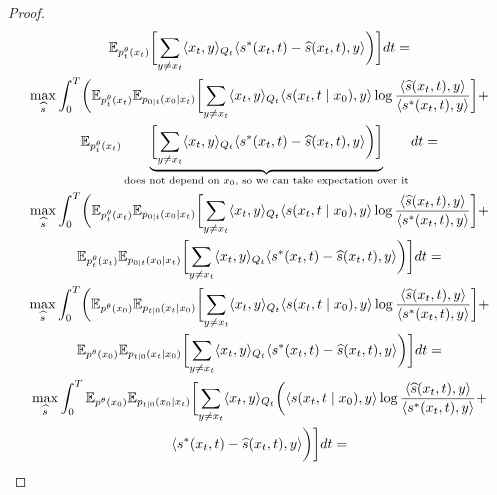 \begin{proof}
\begin{gather}
                 \EE_{p_t^{\theta}(x_t)}\biggl[\sum_{y \neq x_t} \langle x_t, y\rangle_{Q_t}\langle s^{*}(x_t,t) - \widehat{s}(x_t,t), y\rangle\biggr)\biggr]dt =
                 \nonumber \\
                 \max_{\widehat{s}}\int_0^T  \biggl(\EE_{p_t^{\theta}(x_t)}\mathbb{E}_{p_{0 \mid t}(x_0 \mid x_t)} \biggl[\sum_{y \neq x_t} \langle x_t, y\rangle_{Q_t}  \langle s(x_t, t\mid x_0), y \rangle \log \frac{\langle \widehat{s}(x_t,t), y\rangle}{\langle s^{*}(x_t,t), y\rangle}\biggr] + \\
                \EE_{p_t^{\theta}(x_t)}\underbrace{\biggl[\sum_{y \neq x_t} \langle x_t, y\rangle_{Q_t}\langle s^{*}(x_t,t) - \widehat{s}(x_t,t), y\rangle\biggr)\biggr]}_{\text{does not depend on } x_0\text{, so we can take expectation over it}}dt =
                 \nonumber \\
                 \max_{\widehat{s}}\int_0^T  \biggl(\EE_{p_t^{\theta}(x_t)}\mathbb{E}_{p_{0 \mid t}(x_0 \mid x_t)} \biggl[\sum_{y \neq x_t} \langle x_t, y\rangle_{Q_t}  \langle s(x_t, t\mid x_0), y \rangle \log \frac{\langle \widehat{s}(x_t,t), y\rangle}{\langle s^{*}(x_t,t), y\rangle}\biggr] + \nonumber\\
                 \EE_{p_t^{\theta}(x_t)}\EE_{p_{0\mid t} (x_0 \mid x_t)}\biggl[\sum_{y \neq x_t} \langle x_t, y\rangle_{Q_t}\langle s^{*}(x_t,t) - \widehat{s}(x_t,t), y\rangle\biggr)\biggr]dt =
                 \nonumber \\
                 \max_{\widehat{s}}\int_0^T  \biggl(\EE_{p^{\theta}(x_0)}\mathbb{E}_{p_{t \mid 0}(x_t \mid x_0)} \biggl[\sum_{y \neq x_t} \langle x_t, y\rangle_{Q_t}  \langle s(x_t, t\mid x_0), y \rangle \log \frac{\langle \widehat{s}(x_t,t), y\rangle}{\langle s^{*}(x_t,t), y\rangle}\biggr] + \nonumber\\
                 \EE_{p^{\theta}(x_0)}\mathbb{E}_{p_{t \mid 0}(x_t \mid x_0)}\biggl[\sum_{y \neq x_t} \langle x_t, y\rangle_{Q_t}\langle s^{*}(x_t,t) - \widehat{s}(x_t,t), y\rangle\biggr)\biggr]dt =
                 \nonumber \\
                 \max_{\widehat{s}}\int_0^T \EE_{p^{\theta}(x_0)}\mathbb{E}_{p_{t \mid 0}(x_0 \mid x_t)}  \biggl[ \sum_{y \neq x_t} \langle x_t, y\rangle_{Q_t} \biggl(\langle s(x_t, t\mid x_0), y \rangle \log \frac{\langle \widehat{s}(x_t,t), y\rangle}{\langle s^{*}(x_t,t), y\rangle} + \nonumber \\
                  \langle s^{*}(x_t,t) - \widehat{s}(x_t,t), y\rangle\biggr)\biggr]dt =
                 \nonumber \\

\end{gather}
\end{proof}
